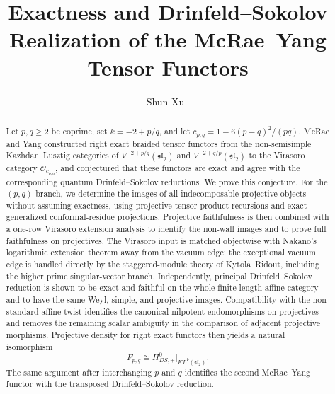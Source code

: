 \documentclass[12pt,leqno]{amsart}
\numberwithin{equation}{section}
\newcommand{\KL}{KL}
\newcommand{\Oc}{\mathcal O}
\begin{document}
\title[Exactness and DS realization]{Exactness and Drinfeld--Sokolov Realization of the McRae--Yang Tensor Functors}

\author{Shun Xu~}

\address{School of Mathematical Sciences, Anhui University, Anhui, Hefei, 230601, China}




\begin{abstract}
Let $p,q\geq2$ be coprime, set $k=-2+p/q$, and let
$c_{p,q}=1-6(p-q)^2/(pq)$.  McRae and Yang constructed right exact
braided tensor functors from the non-semisimple Kazhdan--Lusztig
categories of $V^{-2+p/q}(\mathfrak{sl}_2)$ and
$V^{-2+q/p}(\mathfrak{sl}_2)$ to the Virasoro category
$\Oc_{c_{p,q}}$, and conjectured that these functors are exact and agree
with the corresponding quantum Drinfeld--Sokolov reductions.  We prove
this conjecture.  For the $(p,q)$ branch, we determine the images of all
indecomposable projective objects without assuming exactness, using
projective tensor-product recursions and exact generalized
conformal-residue projections.  Projective faithfulness is then combined
with a one-row Virasoro extension analysis to identify the non-wall images
and to prove full faithfulness on projectives.  The Virasoro input is
matched objectwise with Nakano's logarithmic extension theorem away from
the vacuum edge; the exceptional vacuum edge is handled directly by the
staggered-module theory of Kyt\"ol\"a--Ridout, including the higher prime
singular-vector branch.  Independently, principal Drinfeld--Sokolov
reduction is shown to be exact and faithful on the whole finite-length
affine category and to have the same Weyl, simple, and projective images.
Compatibility with the non-standard affine twist identifies the canonical
nilpotent endomorphisms on projectives and removes the remaining scalar
ambiguity in the comparison of adjacent projective morphisms.  Projective
density for right exact functors then yields a natural isomorphism
\[
 F_{p,q}\cong
 H^0_{DS,+}\big|_{\KL^k(\mathfrak{sl}_2)}.
\]
The same argument after interchanging $p$ and $q$ identifies the second
McRae--Yang functor with the transposed Drinfeld--Sokolov reduction.
\end{abstract}
\end{document}
